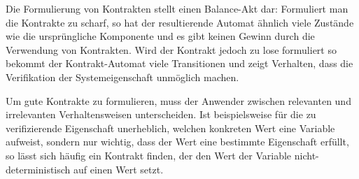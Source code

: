 Die Formulierung von Kontrakten stellt einen Balance-Akt dar:
Formuliert man die Kontrakte zu scharf, so hat der resultierende Automat ähnlich viele Zustände wie die ursprüngliche Komponente und es gibt keinen Gewinn durch die Verwendung von Kontrakten.
Wird der Kontrakt jedoch zu lose formuliert so bekommt der Kontrakt-Automat viele Transitionen und zeigt Verhalten, dass die Verifikation der Systemeigenschaft unmöglich machen.

Um gute Kontrakte zu formulieren, muss der Anwender zwischen relevanten und irrelevanten Verhaltensweisen unterscheiden.
Ist beispielsweise für die zu verifizierende Eigenschaft unerheblich, welchen konkreten Wert eine Variable aufweist, sondern nur wichtig, dass der Wert eine bestimmte Eigenschaft erfüllt, so lässt sich häufig ein Kontrakt finden, der den Wert der Variable nicht-deterministisch auf einen Wert setzt.